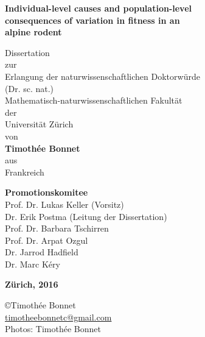 \begin{titlepage}
	\thispagestyle{empty}
    \begin{center}
				 {\onehalfspacing \LARGE\selectfont\upshape\bfseries{Individual-level causes and population-level\\consequences of variation in fitness in an\\alpine rodent\\}}
				
				\vspace{1cm}
				
				\noindent\makebox[\linewidth]{\rule{0.8\paperwidth}{1pt}}
        
        \vspace{1cm}
				{\fontsize{22}{32pt}
				\doublespacing
        Dissertation
				\\
				zur
				\\
				Erlangung der naturwissenschaftlichen Doktorw\"urde
				\\
        (Dr. sc. nat.)
				\\
				Mathematisch-naturwissenschaftlichen Fakult\"at
				\\
				der
				\\
				Universit\"at Z\"urich
				\\
				von
				\\
        \vspace{1cm}
        \textbf{Timoth\'ee Bonnet}
        \\
				aus
				\\
				Frankreich
				
				\vspace{1cm}
				\textbf{Promotionskomitee}
				\\
				Prof. Dr. Lukas Keller (Vorsitz)
				\\
				Dr. Erik Postma (Leitung der Dissertation)
				\\
				Prof. Dr. Barbara Tschirren
				\\
				Prof. Dr. Arpat Ozgul
				\\
				Dr. Jarrod Hadfield
				\\
				Dr. Marc K\'ery
				\\
				}
        \vfill
        
        \textbf{Z\"urich, 2016}
    \end{center}
	
\end{titlepage}

	\clearpage
\begin{titlepage}
	\thispagestyle{empty}

\null\vfill
\noindent \copyright  Timoth\'ee Bonnet\\
\href{mailto:timotheebonnetc@gmail.com}{timotheebonnetc@gmail.com}\\
Photos: Timoth\'ee Bonnet
\end{titlepage}